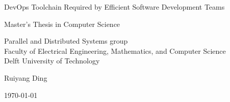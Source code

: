 \begin{titlepage}

  \begin{center}
  \null\vfill
    \begin{center}
    \LARGE{DevOps Toolchain Required by Efficient Software Development Teams}
    \end{center}

    \vspace{3cm}

    \begin{large}
    Master's Thesis in Computer Science
    \end{large}

    \vspace{1.5cm}

    \begin{normalsize}
    Parallel and Distributed Systems group\\
    Faculty of Electrical Engineering, Mathematics, and Computer Science\\
    Delft University of Technology
    \end{normalsize}

    \vspace{2.0cm}

    \begin{normalsize}
Ruiyang Ding
    \end{normalsize}

    \vspace{1.0cm}

    \today            %

  \vfill
  \end{center}

\end{titlepage}

